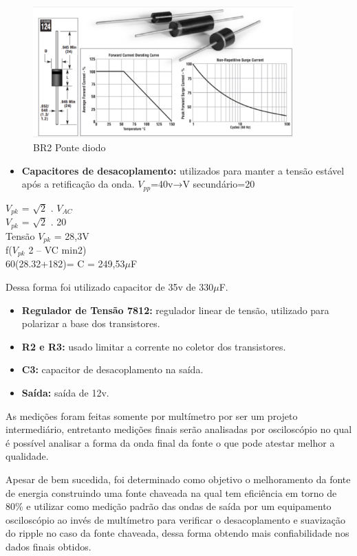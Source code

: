 \begin{figure}[H]
	\centering
	\includegraphics[width=10cm]{figuras/ponte_diodo.png}
	\caption{BR2 Ponte diodo}
	\label{Ponte diodo}
\end{figure}

\begin{itemize}
	\item \textbf{Capacitores de desacoplamento:} utilizados para manter a tensão estável após a retificação da onda.
	$V_{pp}$=40v→V secundário=20
\end{itemize}

\begin{center}
	$V_{pk}$ = $\sqrt{2}$ . $V_{AC}$ \\
	$V_{pk}$ = $\sqrt{2}$ . 20 \\
	Tensão  $V_{pk}$ = 28,3V \\
	f($V_{pk}$ 2 – VC min2) \\
	60(28.32+182)= C = 249,53$\mu$F \\
\end{center}

Dessa forma foi utilizado capacitor de 35v de 330$\mu$F.

\begin{itemize}
	\item \textbf{Regulador de Tensão 7812:} regulador linear de tensão, utilizado para polarizar a base dos  transistores.
	\item \textbf{R2 e R3:} usado limitar a corrente no coletor dos transistores.
	\item \textbf{C3:} capacitor de desacoplamento na saída.
	\item \textbf{Saída:} saída de 12v.

\end{itemize}

As medições foram feitas somente por multímetro por ser um projeto intermediário, entretanto medições finais serão analisadas por osciloscópio no qual é possível analisar a forma da onda final da fonte o que pode atestar melhor a qualidade.

Apesar de bem sucedida, foi determinado como objetivo  o melhoramento da fonte de energia construindo uma fonte chaveada na qual tem eficiência em torno de 80\% e utilizar como medição padrão das ondas de saída por um equipamento  osciloscópio ao invés de multímetro para verificar o desacoplamento e suavização do ripple no caso da fonte chaveada, dessa forma obtendo mais confiabilidade nos dados finais obtidos.
